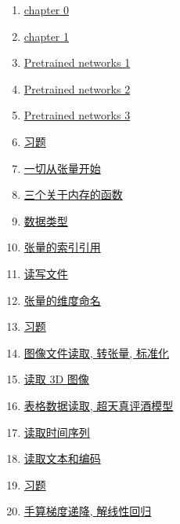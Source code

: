 \documentclass[11pt]{article}
\begin{document}
\begin{multicols}{2}
	\begin{enumerate}
		\item \href{https://mp.weixin.qq.com/s/cUuTYKWo6SB2EMqSHGo0BQ}{chapter 0}	%
		\item \href{https://mp.weixin.qq.com/s/uJAvG8qmZBIKUHUkCzMdDg}{chapter 1}	%
		\item \href{https://mp.weixin.qq.com/s/ay522YZNJ15wyjcwLGf3cA}{Pretrained networks 1}	%
		\item \href{https://mp.weixin.qq.com/s/dUHzCriNFep4HvwjeDCy-A}{Pretrained networks 2}	%
		\item \href{https://mp.weixin.qq.com/s/yOL6ihoa01JpU0K3LaPQOg}{Pretrained networks 3}	%
		\item \href{https://mp.weixin.qq.com/s/bbl96mA31YYauQWmXRTW3A}{习题}	%
		\item \href{https://mp.weixin.qq.com/s/RkoyWy9ul7FMVMJ9G0MZqA}{一切从张量开始}	%
		\item \href{https://mp.weixin.qq.com/s/d88KyZeRb84xeu3o9MOF7g}{三个关于内存的函数}	%
		\item \href{https://mp.weixin.qq.com/s/Ess4ISXREbBOEhauK5hXlQ}{数据类型}	%
		\item \href{https://mp.weixin.qq.com/s/x-C09e4k52Rm_C45KOIhPQ}{张量的索引引用}	%
		\item \href{https://mp.weixin.qq.com/s/2VNR9Tkhkpv0QohMH7tw_A}{读写文件}	%
		\item \href{https://mp.weixin.qq.com/s/YBjwu2C83BD-nFpTZ6a5iw}{张量的维度命名}	%
		\item \href{https://mp.weixin.qq.com/s/PjfZ2NQcBZ1pb6bjU5SFnQ}{习题}	%
		\item \href{https://mp.weixin.qq.com/s/6Zr57a7Y12dTeMSLQHdeVg}{图像文件读取, 转张量, 标准化}	%
		\item \href{https://mp.weixin.qq.com/s/BLt4nOj9j7xSHMER2vJNxg}{读取 3D 图像}	%
		\item \href{https://mp.weixin.qq.com/s/JEIy-nk4hYw4cLtlKbwrVg}{表格数据读取, 超天真评酒模型}	%
		\item \href{https://mp.weixin.qq.com/s/FdtFEyBZBv7qE9RRbR0wlg}{读取时间序列}	%
		\item \href{https://mp.weixin.qq.com/s/QONqTxujiCUMmsq-AGbtNg}{读取文本和编码}	%
		\item \href{https://mp.weixin.qq.com/s/z4F4pyPWw_RAKHVmAMEVGg}{习题}	%
		\item \href{https://mp.weixin.qq.com/s/fPJ5to-eRDArbBEmmYxI1Q}{手算梯度递降, 解线性回归}	%

\end{enumerate}
\end{multicols}
\end{document}
